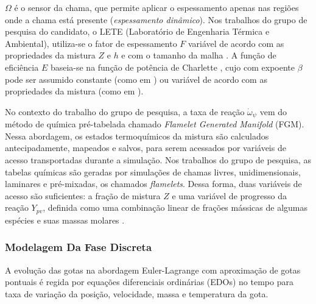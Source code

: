 $\Omega$ é o sensor da chama, que permite aplicar o espessamento apenas nas regiões onde a chama está presente (\emph{espessamento dinâmico}).
Nos trabalhos do grupo de pesquisa do candidato, o LETE (Laboratório de Engenharia Térmica e Ambiental), utiliza-se o fator de espessamento $F$ variável de acordo com as propriedades da mistura $Z$ e $h$ e com o tamanho da malha \cite{SacomanoF2017PhD,SacomanoF2017CF}.
A função de eficiência $E$ baseia-se na função de potência de Charlette \cite{CharletteF2002}, cujo com expoente $\beta$ pode ser assumido constante (como em \cite{SacomanoF2017PhD,SacomanoF2017CF,SacomanoF2019IJHMT,ShastryV2023,SekularacN2024}) ou variável de acordo com as propriedades da mistura (como em \cite{SacomanoF2020CF}).

No contexto do trabalho do grupo de pesquisa, a taxa de reação $\dot \omega_\psi$ vem do método de química pré-tabelada chamado \emph{Flamelet Generated Manifold} (FGM).
Nessa abordagem, os estados termoquímicos da mistura são calculados antecipadamente, mapeados e salvos, para serem acessados por variáveis de acesso transportadas durante a simulação.
Nos trabalhos do grupo de pesquisa, as tabelas químicas são geradas por simulações de chamas livres, unidimensionais, laminares e pré-mixadas, os chamados \emph{flamelets}.
Dessa forma, duas variáveis de acesso são suficientes: a fração de mistura $Z$ e uma variável de progresso da reação $Y_{pv}$, definida como uma combinação linear de frações mássicas de algumas espécies e suas massas molares \cite{SacomanoF2018CTM}.    
    

\subsubsection{Modelagem Da Fase Discreta} \label{sec:gotas}

A evolução das gotas na abordagem Euler-Lagrange com aproximação de gotas pontuais é regida por equações diferenciais ordinárias (EDOs) no tempo para taxa de variação da posição, velocidade, massa e temperatura da gota.

